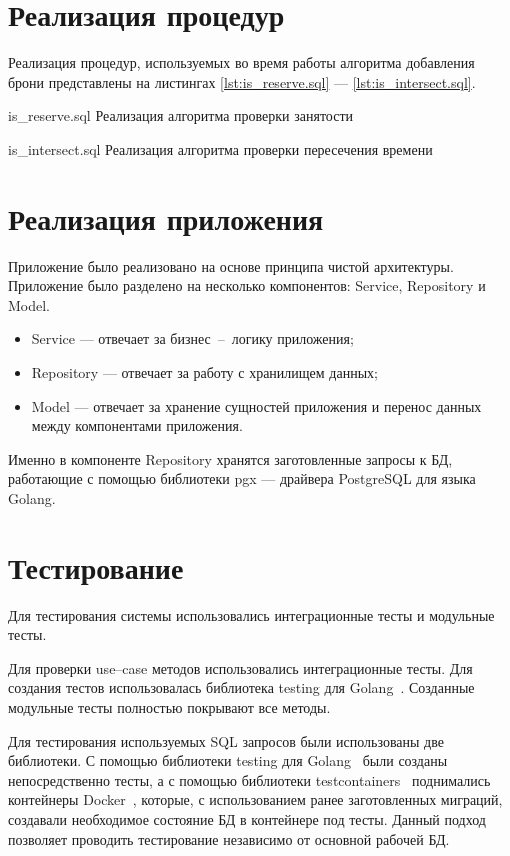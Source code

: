 \section{Реализация процедур}
Реализация процедур, используемых во время работы алгоритма добавления брони представлены на листингах \ref{lst:is_reserve.sql} --- \ref{lst:is_intersect.sql}.
\newline

{is_reserve.sql}
{Реализация алгоритма проверки занятости}
\newpage

{is_intersect.sql}
{Реализация алгоритма проверки пересечения времени}

\section{Реализация приложения}

Приложение было реализовано на основе принципа чистой архитектуры.
Приложение было разделено на несколько компонентов: Service, Repository и Model.
\begin{itemize}
	\item Service --- отвечает за бизнес~--~логику приложения;
	\item Repository --- отвечает за работу с хранилищем данных;
	\item Model --- отвечает за хранение сущностей приложения и перенос данных между компонентами приложения.
\end{itemize}
Именно в компоненте Repository хранятся заготовленные запросы к БД, работающие с помощью библиотеки pgx --- драйвера PostgreSQL для языка Golang. 



\section{Тестирование}
Для тестирования системы использовались интеграционные тесты и модульные тесты.

Для проверки use--case методов использовались интеграционные тесты.
Для создания тестов использовалась библиотека testing для Golang~\cite{golang_testing}.
Созданные модульные тесты полностью покрывают все методы.

Для тестирования используемых SQL запросов были использованы две библиотеки.
С помощью библиотеки testing для Golang~\cite{golang_testing} были созданы непосредственно тесты, а с помощью библиотеки testcontainers~\cite{golang_testcontainers} поднимались контейнеры Docker~\cite{docker}, которые, с использованием ранее заготовленных миграций, создавали необходимое состояние БД в контейнере под тесты.
Данный подход позволяет проводить тестирование независимо от основной рабочей БД.

